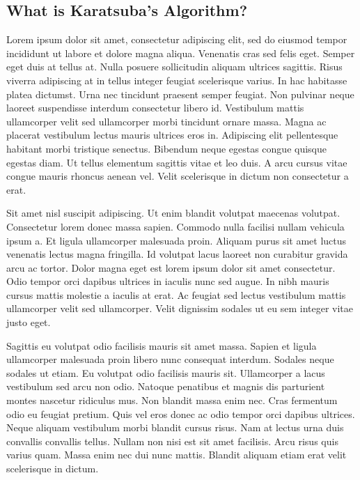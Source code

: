 \documentclass[12pt]{article}
\begin{document}
\subsection{What is Karatsuba's Algorithm?}
Lorem ipsum dolor sit amet, consectetur adipiscing elit, sed do eiusmod tempor incididunt ut labore et dolore magna aliqua. Venenatis cras sed felis eget. Semper eget duis at tellus at. Nulla posuere sollicitudin aliquam ultrices sagittis. Risus viverra adipiscing at in tellus integer feugiat scelerisque varius. In hac habitasse platea dictumst. Urna nec tincidunt praesent semper feugiat. Non pulvinar neque laoreet suspendisse interdum consectetur libero id. Vestibulum mattis ullamcorper velit sed ullamcorper morbi tincidunt ornare massa. Magna ac placerat vestibulum lectus mauris ultrices eros in. Adipiscing elit pellentesque habitant morbi tristique senectus. Bibendum neque egestas congue quisque egestas diam. Ut tellus elementum sagittis vitae et leo duis. A arcu cursus vitae congue mauris rhoncus aenean vel. Velit scelerisque in dictum non consectetur a erat.\par
Sit amet nisl suscipit adipiscing. Ut enim blandit volutpat maecenas volutpat. Consectetur lorem donec massa sapien. Commodo nulla facilisi nullam vehicula ipsum a. Et ligula ullamcorper malesuada proin. Aliquam purus sit amet luctus venenatis lectus magna fringilla. Id volutpat lacus laoreet non curabitur gravida arcu ac tortor. Dolor magna eget est lorem ipsum dolor sit amet consectetur. Odio tempor orci dapibus ultrices in iaculis nunc sed augue. In nibh mauris cursus mattis molestie a iaculis at erat. Ac feugiat sed lectus vestibulum mattis ullamcorper velit sed ullamcorper. Velit dignissim sodales ut eu sem integer vitae justo eget.\par
Sagittis eu volutpat odio facilisis mauris sit amet massa. Sapien et ligula ullamcorper malesuada proin libero nunc consequat interdum. Sodales neque sodales ut etiam. Eu volutpat odio facilisis mauris sit. Ullamcorper a lacus vestibulum sed arcu non odio. Natoque penatibus et magnis dis parturient montes nascetur ridiculus mus. Non blandit massa enim nec. Cras fermentum odio eu feugiat pretium. Quis vel eros donec ac odio tempor orci dapibus ultrices. Neque aliquam vestibulum morbi blandit cursus risus. Nam at lectus urna duis convallis convallis tellus. Nullam non nisi est sit amet facilisis. Arcu risus quis varius quam. Massa enim nec dui nunc mattis. Blandit aliquam etiam erat velit scelerisque in dictum.\par
\end{document}
